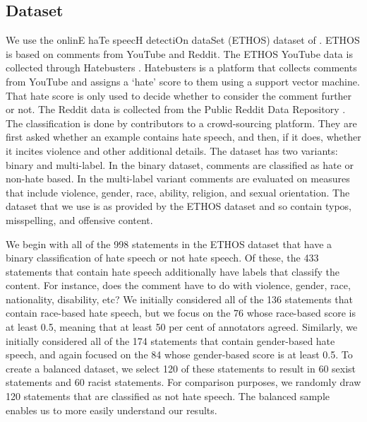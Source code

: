 \documentclass[12pt,]{article}
\begin{document}
\hypertarget{dataset}{%
\subsection{Dataset}\label{dataset}}

We use the onlinE haTe speecH detectiOn dataSet (ETHOS) dataset of \citet{mollas2020ethos}. ETHOS is based on comments from YouTube and Reddit. The ETHOS YouTube data is collected through Hatebusters \citep{anagnostou2018hatebusters}. Hatebusters is a platform that collects comments from YouTube and assigns a `hate' score to them using a support vector machine. That hate score is only used to decide whether to consider the comment further or not. The Reddit data is collected from the Public Reddit Data Repository \citep{baumgartner2020pushshift}. The classification is done by contributors to a crowd-sourcing platform. They are first asked whether an example contains hate speech, and then, if it does, whether it incites violence and other additional details. The dataset has two variants: binary and multi-label. In the binary dataset, comments are classified as hate or non-hate based. In the multi-label variant comments are evaluated on measures that include violence, gender, race, ability, religion, and sexual orientation. The dataset that we use is as provided by the ETHOS dataset and so contain typos, misspelling, and offensive content.

We begin with all of the 998 statements in the ETHOS dataset that have a binary classification of hate speech or not hate speech. Of these, the 433 statements that contain hate speech additionally have labels that classify the content. For instance, does the comment have to do with violence, gender, race, nationality, disability, etc? We initially considered all of the 136 statements that contain race-based hate speech, but we focus on the 76 whose race-based score is at least 0.5, meaning that at least 50 per cent of annotators agreed. Similarly, we initially considered all of the 174 statements that contain gender-based hate speech, and again focused on the 84 whose gender-based score is at least 0.5. To create a balanced dataset, we select 120 of these statements to result in 60 sexist statements and 60 racist statements. For comparison purposes, we randomly draw 120 statements that are classified as not hate speech. The balanced sample enables us to more easily understand our results.
\end{document}
